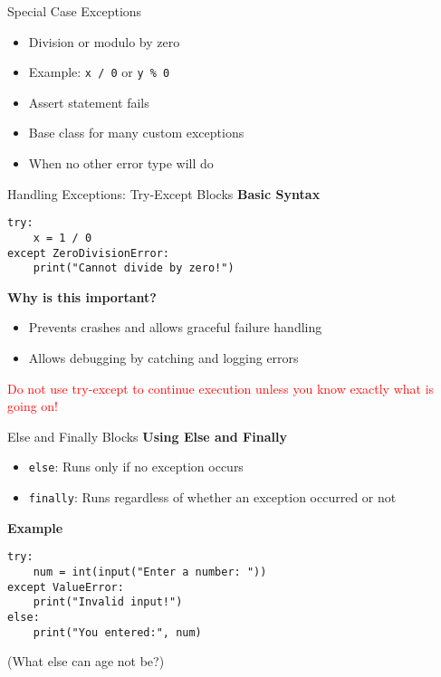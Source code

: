 \documentclass[aspectratio=169]{beamer}
\renewcommand{\emph}[1]{\textcolor{red}{#1}}
\begin{document}
\begin{frame}{Special Case Exceptions}
    \begin{itemize}[<2->]
        \item Division or modulo by zero
        \item Example: \texttt{x / 0} or \texttt{y \% 0}
    \end{itemize}

    \begin{itemize}[<5->]
        \item Assert statement fails
    \end{itemize}

    \begin{itemize}[<7->]
        \item Base class for many custom exceptions
        \item When no other error type will do
    \end{itemize}
\end{frame}

\begin{frame}[fragile]{Handling Exceptions: Try-Except Blocks}
    \textbf{Basic Syntax}
    \pause
    \begin{lstlisting}
try:
    x = 1 / 0
except ZeroDivisionError:
    print("Cannot divide by zero!")
    \end{lstlisting}
    
    \pause
    \textbf{Why is this important?}
    \begin{itemize}[<+->]
        \item Prevents crashes and allows graceful failure handling
        \item Allows debugging by catching and logging errors
    \end{itemize}
    \pause
    \emph{Do not use try-except to continue execution unless you know exactly what is going on!}
\end{frame}

\begin{frame}[fragile]{Else and Finally Blocks}
    \textbf{Using Else and Finally}
    \begin{itemize}[<+->]
        \item \texttt{else}: Runs only if no exception occurs
        \item \texttt{finally}: Runs regardless of whether an exception occurred or not
    \end{itemize}

    \pause
    \textbf{Example}
    \pause
    \begin{lstlisting}
try:
    num = int(input("Enter a number: "))
except ValueError:
    print("Invalid input!")
else:
    print("You entered:", num)
    \end{lstlisting}

    \pause
    (What else can age not be?)
\end{frame}
\end{document}
